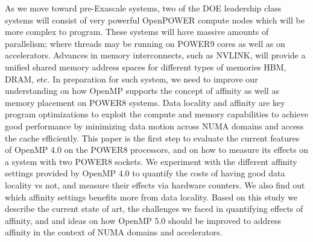 As we move toward pre-Exascale systems, two of the DOE leadership class systems will consist of very powerful OpenPOWER compute nodes which will be more complex to program. These systems will have massive amounts of parallelism; where threads may be running on POWER9 cores as well as on accelerators. Advances in memory interconnects, such as NVLINK, will provide a unified shared memory address spaces for different types of memories HBM, DRAM, etc. In preparation for such system, we need to improve our understanding on how OpenMP supports the concept of affinity as well as memory placement on POWER8 systems. Data locality and affinity are key 
program optimizations to exploit the compute and memory capabilities to achieve good performance by minimizing data motion across NUMA domains and access the cache efficiently. This paper is the first step to evaluate the current features of OpenMP 4.0 on the POWER8 processors, and on how to measure its effects on a system with two POWER8 sockets. We experiment with the different affinity settings provided by OpenMP 4.0 to quantify the costs of having good data locality vs not,  and measure their effects via hardware counters. We also find out which affinity settings benefits more from data locality. Based on this study we describe the current state of art, the challenges we faced in quantifying effects of affinity, and and ideas on how OpenMP 5.0 should be improved to address affinity in the context of NUMA domains and accelerators.


